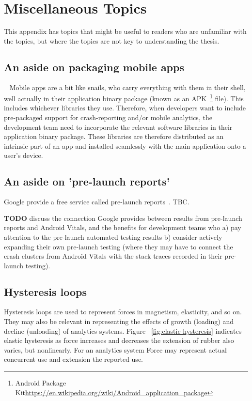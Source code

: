 \chapter{Miscellaneous Topics}
This appendix has topics that might be useful to readers who are unfamiliar with the topics, but where the topics are not key to understanding the thesis. 

\section{An aside on packaging mobile apps}~\label{section-packaging-mobile-apps}
Mobile apps are a bit like snails, who carry everything with them in their shell, well actually in their application binary package (known as an APK~\footnote{Android Package Kit\url{https://en.wikipedia.org/wiki/Android_application_package}} file). This includes whichever libraries they use. Therefore, when developers want to include pre-packaged support for crash-reporting and/or mobile analytics, the development team need to incorporate the relevant software libraries in their application binary package. These libraries are therefore distributed as an intrinsic part of an app and installed seamlessly with the main application onto a user's device.

\section{An aside on 'pre-launch reports'}
Google provide a free service called pre-launch reports~\cite{google_use_pre_launch_reports}. TBC.

\textbf{TODO} discuss the connection Google provides between results from pre-launch reports and Android Vitals, and the benefits for development teams who a) pay attention to the pre-launch automated testing results b) consider actively expanding their own pre-launch testing (where they may have to connect the crash clusters from Android Vitals with the stack traces recorded in their pre-launch testing).

\section{Hysteresis loops}

Hysteresis loops are used to represent forces in magnetism, elasticity, and so on. They may also be relevant in representing the effects of growth (loading) and decline (unloading) of analytics systems. Figure ~\ref{fig:elastic-hysteresis} indicates elastic hysteresis as force increases and decreases the extension of rubber also varies, but nonlinearly. For an analytics system Force may represent actual concurrent use and extension the reported use.

